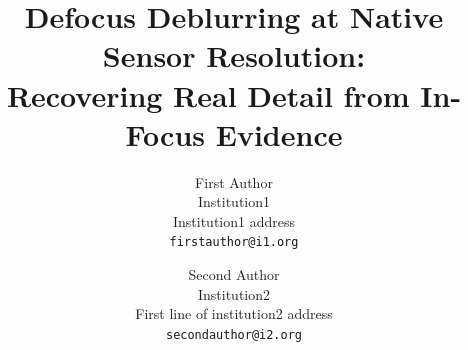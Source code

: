 \documentclass[10pt,twocolumn,letterpaper]{article}
\title{Defocus Deblurring at Native Sensor Resolution:\\ Recovering Real Detail from In-Focus Evidence}  %
\author{First Author\\
Institution1\\
Institution1 address\\
{\tt\small firstauthor@i1.org}
\and
Second Author\\
Institution2\\
First line of institution2 address\\
{\tt\small secondauthor@i2.org}
}
\begin{document}
\maketitle
    





{
    \small
    
    
}

% 
\end{document}
